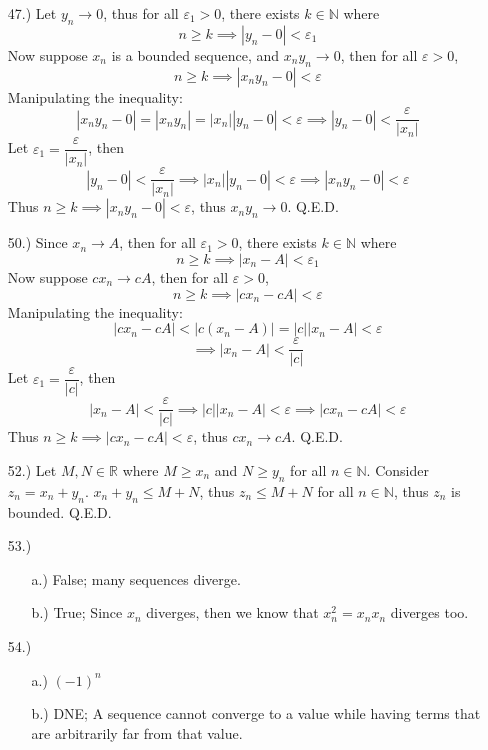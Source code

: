 \documentclass[12pt]{article}
\newcommand{\vertb}[1]{\left\vert#1\right\vert}
\newcommand{\e}{\varepsilon}
\begin{document}
\begin{itemize}
    \item [47.)] Let $y_n\to0$, thus for all $\e_1>0$, there exists $k\in\mathbb{N}$ where
    \[n\geq k\implies\vertb{y_n-0}<\e_1\]
    Now suppose $x_n$ is a bounded sequence, and $x_ny_n\to0$, then for all $\e>0$,
    \[n\geq k\implies\vertb{x_ny_n-0}<\e\]
    Manipulating the inequality:
    \[\vertb{x_ny_n-0}=\vertb{x_ny_n}=\vertb{x_n}\vertb{y_n-0}<\e\implies\vertb{y_n-0}<\frac{\e}{\vertb{x_n}}\]
    Let $\e_1=\dfrac{\e}{\vertb{x_n}}$, then
    \[\vertb{y_n-0}<\frac{\e}{\vertb{x_n}}\implies\vertb{x_n}\vertb{y_n-0}<\e\implies\vertb{x_ny_n-0}<\e\]
    Thus $n\geq k\implies\vertb{x_ny_n-0}<\e$, thus $x_ny_n\to0$. Q.E.D.



    \item [50.)] Since $x_n\to A$, then for all $\e_1>0$, there exists $k\in\mathbb{N}$ where
    \[n\geq k\implies\vertb{x_n-A}<\e_1\]
    Now suppose $cx_n\to cA$, then for all $\e>0$,
    \[n\geq k\implies\vertb{cx_n-cA}<\e\]
    Manipulating the inequality:
    \[\vertb{cx_n-cA}<\vertb{c(x_n-A)}=\vertb{c}\vertb{x_n-A}<\e\]
    \[\implies\vertb{x_n-A}<\frac{\e}{\vertb c}\]
    Let $\e_1=\dfrac{\e}{\vertb c}$, then
    \[\vertb{x_n-A}<\frac{\e}{\vertb c}\implies\vertb{c}\vertb{x_n-A}<\e\implies\vertb{cx_n-cA}<\e\]
    Thus $n\geq k\implies\vertb{cx_n-cA}<\e$, thus $cx_n\to cA$. Q.E.D.

    \item [52.)] Let $M,N\in\mathbb{R}$ where $M\geq x_n$ and $N\geq y_n$ for all $n\in\mathbb{N}$. Consider $z_n=x_n+y_n$. $x_n+y_n\leq M+N$, thus $z_n\leq M+N$ for all $n\in\mathbb{N}$, thus $z_n$ is bounded. Q.E.D.

    \item [53.)] \begin{itemize}
        \item [a.)] False; many sequences diverge.

        \item [b.)] True; Since $x_n$ diverges, then we know that $x^2_n=x_nx_n$ diverges too.
    \end{itemize}

    \item [54.)] \begin{itemize}
        \item [a.)] $(-1)^n$

        \item [b.)] DNE; A sequence cannot converge to a value while having terms that are arbitrarily far from that value.
    \end{itemize}


\end{itemize}
\end{document}

